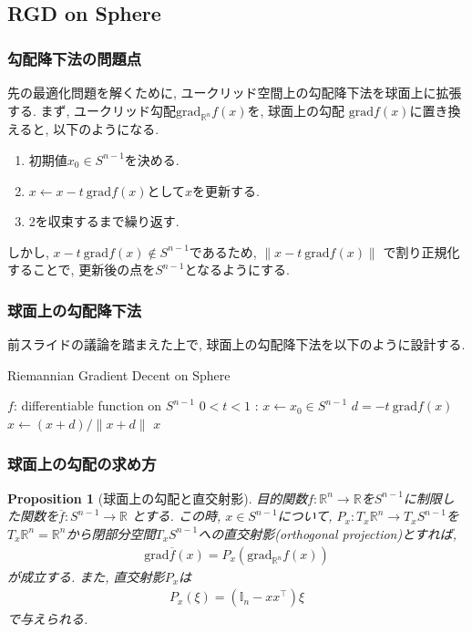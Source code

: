 \documentclass[dvipdfmx,11pt]{beamer}		%
\newtheorem{prop}[defi]{Proposition}
\newcommand{\R}{\mathbb{R}}
\begin{document}
    \subsection{RGD on Sphere}
    \begin{frame}
        \frametitle{勾配降下法の問題点}
        先の最適化問題を解くために, ユークリッド空間上の勾配降下法を球面上に拡張する. 
        まず, ユークリッド勾配$\mathrm{grad}_{\R^n}f(x)$を, 球面上の勾配
        $\mathrm{grad}f(x)$に置き換えると, 以下のようになる. 
        \begin{enumerate}
            \item 初期値$x_{0}\in S^{n - 1}$を決める.
            \item $x\leftarrow x - t~\mathrm{grad} f(x)$として$x$を更新する.
            \item 2を収束するまで繰り返す. 
        \end{enumerate}
        しかし, $x - t~\mathrm{grad} f(x)\notin S^{n - 1}$であるため, $\|x - t~\mathrm{grad} f(x)\|$
        で割り正規化することで, 更新後の点を$S^{n - 1}$となるようにする. 
    \end{frame}
    \begin{frame}
        \frametitle{球面上の勾配降下法}
        前スライドの議論を踏まえた上で, 球面上の勾配降下法を以下のように設計する. 
        \begin{algorithm}[H]
            \caption{Riemannian Gradient Decent on Sphere}
            \begin{algorithmic}
                \REQUIRE $f$: differentiable function on $S^{n - 1}$
                \REQUIRE $0< t <1$ : 
                \STATE $x\leftarrow x_{0}\in S^{n - 1}$
                \STATE $d = -t~\mathrm{grad} f(x)$
                \STATE $x\leftarrow (x + d)/\|x + d\|$ 
                \ENDWHILE
                \RETURN $x$
            \end{algorithmic}
        \end{algorithm}
    \end{frame}
    \begin{frame}
        \frametitle{球面上の勾配の求め方}
        \begin{prop}[球面上の勾配と直交射影]
            目的関数$f:\R^{n}\to\R$を$S^{n - 1}$に制限した関数を$\overline{f}:S^{n - 1}\to\R$
            とする. この時, $x\in S^{n -1}$について, $P_x : T_{x}\R^{n}\to T_{x}S^{n - 1}$を
            $T_{x}\R^n = \R^n$から閉部分空間$T_{x}S^{n - 1}$への直交射影(orthogonal projection)とすれば,
            \begin{align*}
                \mathrm{grad} \overline{f}(x) = P_{x}(\mathrm{grad}_{\R^{n}}f(x))
            \end{align*}
            が成立する. また, 直交射影$P_x$は 
            \begin{align*}
                P_{x}(\xi) = (\mathbb{I}_{n} - xx^{\top})\xi
            \end{align*}
            で与えられる. 
        \end{prop}
    \end{frame}
\end{document}

